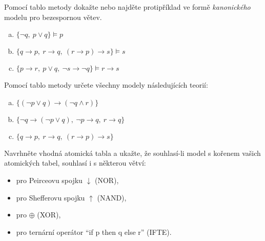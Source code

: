 \begin{problem}
    
    Pomocí tablo metody dokažte nebo najděte protipříklad ve formě \emph{kanonického} modelu pro bezespornou větev.
    \begin{enumerate}[(a)]
        \item $\{ \neg q,\ p \vee q\} \models p$
        \item $\{ q \to p,\ r \to q,\ (r \to p) \to s\} \models s$
        \item $\{ p \to r,\ p \vee q,\ \neg s \to \neg q\} \models r \to s$
    \end{enumerate}

\end{problem}


\begin{problem}

    Pomocí tablo metody určete všechny modely následujících teorií:
    \begin{enumerate}[(a)]
        \item $\{(\neg p \vee q) \to (\neg q \wedge r)\}$
        \item $\{\neg q \to (\neg p \vee q),\ \neg p \to q,\ r \to q\}$
        \item $\{ q \to p,\ r \to q,\ (r \to p) \to s\}$
    \end{enumerate}

\end{problem}


\begin{problem} 
    Navrhněte vhodná atomická tabla a ukažte, že souhlasí-li model s kořenem vašich atomických tabel, souhlasí i s některou větví:
    \begin{itemize}
        \item pro Peirceovu spojku $\downarrow$ (NOR),
        \item pro Shefferovu spojku $\uparrow$ (NAND),
        \item pro $\oplus$ (XOR),
        \item pro ternární operátor ``if p then q else r'' (IFTE).
    \end{itemize}  
    
\end{problem}


